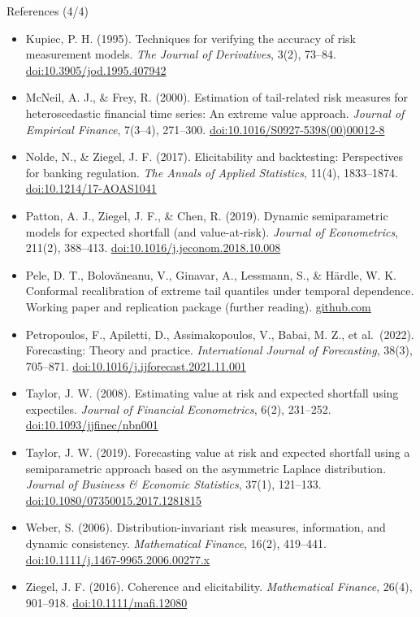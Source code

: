 \begin{frame}{References (4/4)}
\itemsize{\tiny}
\begin{itemize}
    \item Kupiec, P. H. (1995). Techniques for verifying the accuracy of risk measurement models. \textit{The Journal of Derivatives}, 3(2), 73--84. \href{https://doi.org/10.3905/jod.1995.407942}{doi:10.3905/jod.1995.407942}
    \item McNeil, A. J., \& Frey, R. (2000). Estimation of tail-related risk measures for heteroscedastic financial time series: An extreme value approach. \textit{Journal of Empirical Finance}, 7(3--4), 271--300. \href{https://doi.org/10.1016/S0927-5398(00)00012-8}{doi:10.1016/S0927-5398(00)00012-8}
    \item Nolde, N., \& Ziegel, J. F. (2017). Elicitability and backtesting: Perspectives for banking regulation. \textit{The Annals of Applied Statistics}, 11(4), 1833--1874. \href{https://doi.org/10.1214/17-AOAS1041}{doi:10.1214/17-AOAS1041}
    \item Patton, A. J., Ziegel, J. F., \& Chen, R. (2019). Dynamic semiparametric models for expected shortfall (and value-at-risk). \textit{Journal of Econometrics}, 211(2), 388--413. \href{https://doi.org/10.1016/j.jeconom.2018.10.008}{doi:10.1016/j.jeconom.2018.10.008}
    \item Pele, D. T., Bolovăneanu, V., Ginavar, A., Lessmann, S., \& Härdle, W. K. Conformal recalibration of extreme tail quantiles under temporal dependence. Working paper and replication package (further reading). \href{https://github.com/danpele/Conformal_Oracle}{github.com}
    \item Petropoulos, F., Apiletti, D., Assimakopoulos, V., Babai, M. Z., et al.\ (2022). Forecasting: Theory and practice. \textit{International Journal of Forecasting}, 38(3), 705--871. \href{https://doi.org/10.1016/j.ijforecast.2021.11.001}{doi:10.1016/j.ijforecast.2021.11.001}
    \item Taylor, J. W. (2008). Estimating value at risk and expected shortfall using expectiles. \textit{Journal of Financial Econometrics}, 6(2), 231--252. \href{https://doi.org/10.1093/jjfinec/nbn001}{doi:10.1093/jjfinec/nbn001}
    \item Taylor, J. W. (2019). Forecasting value at risk and expected shortfall using a semiparametric approach based on the asymmetric Laplace distribution. \textit{Journal of Business \& Economic Statistics}, 37(1), 121--133. \href{https://doi.org/10.1080/07350015.2017.1281815}{doi:10.1080/07350015.2017.1281815}
    \item Weber, S. (2006). Distribution-invariant risk measures, information, and dynamic consistency. \textit{Mathematical Finance}, 16(2), 419--441. \href{https://doi.org/10.1111/j.1467-9965.2006.00277.x}{doi:10.1111/j.1467-9965.2006.00277.x}
    \item Ziegel, J. F. (2016). Coherence and elicitability. \textit{Mathematical Finance}, 26(4), 901--918. \href{https://doi.org/10.1111/mafi.12080}{doi:10.1111/mafi.12080}
\end{itemize}
\end{frame}


